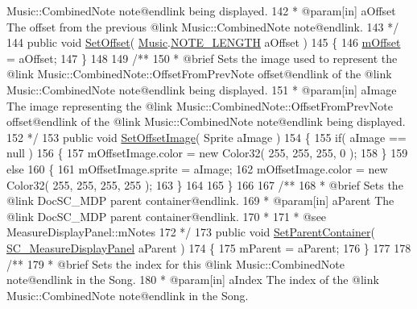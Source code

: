 \begin{DoxyCodeInclude}
{       Music::CombinedNote note@endlink being displayed.}
142 \textcolor{comment}{     * @param[in] aOffset The offset from the previous @link Music::CombinedNote note@endlink.}
143 \textcolor{comment}{    */}
144     \textcolor{keyword}{public} \textcolor{keywordtype}{void} \hyperlink{group___s_c___n_d_p_unity_ga8ff7588e8c3f59a03842feaff92f97e9}{SetOffset}( \hyperlink{class_music}{Music}.\hyperlink{group___music_enums_gaf11b5f079adbb21c800b9eca1c5c3cbd}{NOTE\_LENGTH} aOffset )
145     \{
146         \hyperlink{group___s_c___n_d_p_priv_var_ga0a78a2c25da29d944d56d1c8ebb74d03}{mOffset} = aOffset;
147     \}
148 \textcolor{comment}{}
149 \textcolor{comment}{    /**}
150 \textcolor{comment}{     * @brief Sets the image used to represent the @link Music::CombinedNote::OffsetFromPrevNote
       offset@endlink of the @link Music::CombinedNote note@endlink being displayed.}
151 \textcolor{comment}{     * @param[in] aImage The image representing the @link Music::CombinedNote::OffsetFromPrevNote
       offset@endlink of the @link Music::CombinedNote note@endlink being displayed.}
152 \textcolor{comment}{    */}
153     \textcolor{keyword}{public} \textcolor{keywordtype}{void} \hyperlink{group___s_c___n_d_p_unity_gaa0a517d1359cd1ed109a130bd52763f1}{SetOffsetImage}( Sprite aImage )
154     \{
155         \textcolor{keywordflow}{if}( aImage == null )
156         \{
157             mOffsetImage.color = \textcolor{keyword}{new} Color32( 255, 255, 255, 0 );
158         \}
159         \textcolor{keywordflow}{else}
160         \{
161             mOffsetImage.sprite = aImage;
162             mOffsetImage.color = \textcolor{keyword}{new} Color32( 255, 255, 255, 255 );
163         \}
164 
165     \}
166 \textcolor{comment}{}
167 \textcolor{comment}{    /**}
168 \textcolor{comment}{     * @brief Sets the @link DocSC\_MDP parent container@endlink.}
169 \textcolor{comment}{     * @param[in] aParent The @link DocSC\_MDP parent container@endlink.}
170 \textcolor{comment}{     * }
171 \textcolor{comment}{     * @see MeasureDisplayPanel::mNotes}
172 \textcolor{comment}{    */}
173     \textcolor{keyword}{public} \textcolor{keywordtype}{void} \hyperlink{group___s_c___n_d_p_unity_gae642b50484b9c7fb2bd3b201aeef726c}{SetParentContainer}( \hyperlink{class_s_c___measure_display_panel}{SC\_MeasureDisplayPanel} aParent 
      )
174     \{
175         mParent = aParent;
176     \}
177 \textcolor{comment}{}
178 \textcolor{comment}{    /**}
179 \textcolor{comment}{     * @brief Sets the index for this @link Music::CombinedNote note@endlink in the Song.}
180 \textcolor{comment}{     * @param[in] aIndex The index of the @link Music::CombinedNote note@endlink in the Song.}

\end{DoxyCodeInclude}
